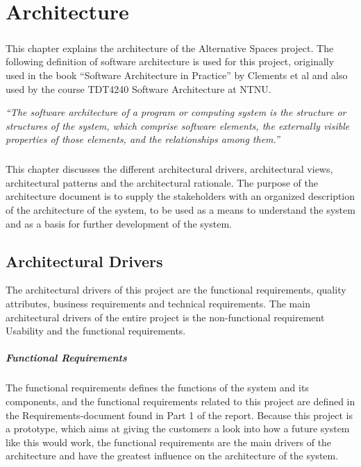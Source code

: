 \chapter{Architecture}
\label{chap:Arch}

\paragraph{} This chapter explains the architecture of the Alternative Spaces project. The following definition of software architecture is used for this project, originally used in the book ``Software Architecture in Practice'' by Clements et al and also used by the course TDT4240 Software Architecture at NTNU. 

\bigskip
\hfill\begin{minipage}{\dimexpr\textwidth-1cm}
\emph{``The software architecture of a program or computing system is the structure or structures of the system, which comprise software elements, the externally visible properties of those elements, and the relationships among them.''}
\end{minipage}

\paragraph{} This chapter discusses the different architectural drivers, architectural views, architectural patterns and the architectural rationale. The purpose of the architecture document is to supply the stakeholders with an organized description of the architecture of the system, to be used as a means to understand the system and as a basis for further development of the system. 

\newpage
\section{Architectural Drivers}

The architectural drivers of this project are the functional requirements, quality attributes, business requirements and technical requirements. The main architectural drivers of the entire project is the non-functional requirement Usability and the functional requirements. 

\paragraph{Functional Requirements}
The functional requirements defines the functions of the system and its components, and the functional requirements related to this project are defined in the Requirements-document found in Part 1 of the report. Because this project is a prototype, which aims at giving the customers a look into how a future system like this would work, the functional requirements are the main drivers of the architecture and have the greatest influence on the architecture of the system. 

